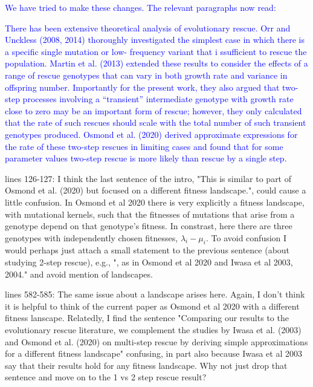\documentclass[12pt]{extarticle}
\begin{document}
\textcolor{blue}{ We have tried to make these changes. The relevant paragraphs now read:
\begin{displayquote}
There has been extensive theoretical analysis of evolutionary rescue. Orr and Unckless (2008,
2014) thoroughly investigated the simplest case in which there is a specific single mutation or low-
frequency variant that i ssufficient to rescue the population. 
Martin et al. (2013) extended these results
to consider the effects of a range of rescue genotypes that can vary in both growth rate and variance in
offspring number. 
Importantly for the present work, they also argued that two-step processes involving
a ``transient'' intermediate genotype with growth rate close to zero may be an important form of rescue;
however, they only calculated that the rate of such rescues should scale with the total number of such
transient genotypes produced. Osmond et al. (2020) derived approximate expressions for the rate of
these two-step rescues in limiting cases and found that for some parameter values two-step rescue is
more likely than rescue by a single step.
\end{displayquote}
}


lines 126-127: I think the last sentence of the intro, "This is similar to part of Osmond et al. (2020) but focused on a different fitness landscape.", could cause a little confusion. In Osmond et al 2020 there is very explicitly a fitness landscape, with mutational kernels, such that the fitnesses of mutations that arise from a genotype depend on that genotype's fitness. In constrast, here there are three genotypes with independently chosen fitnesses, $\lambda_i - \mu_i$. To avoid confusion I would perhaps just attach a small statement to the previous sentence (about studying 2-step rescue), e.g., ", as in Osmond et al 2020 and Iwasa et al 2003, 2004." and avoid mention of landscapes.

lines 582-585: The same issue about a landscape arises here. Again, I don't think it is helpful to think of the current paper as Osmond et al 2020 with a different fitness lanscape. Relatedly, I find the sentence "Comparing our results to the evolutionary rescue literature, we complement the studies by Iwasa et al. (2003) and Osmond et al. (2020) on multi-step rescue by deriving simple approximations for a different fitness landscape" confusing, in part also because Iwasa et al 2003 say that their results hold for any fitness landscape. Why not just drop that sentence and move on to the 1 vs 2 step rescue result?
\end{document}

